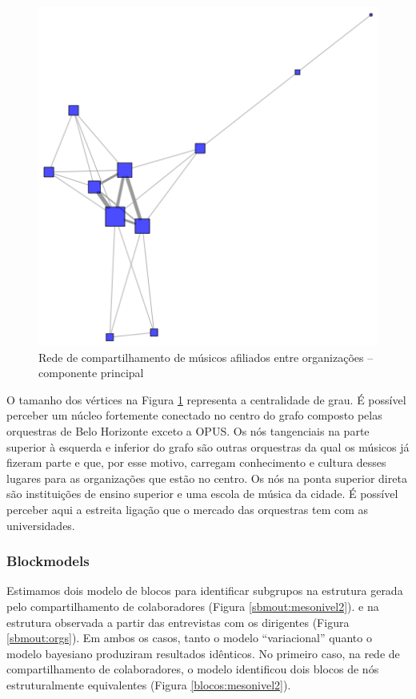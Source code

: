 \documentclass[a4paper, 12pt, openright, oneside, german, french, english, brazil]{abntex2}
\begin{document}
	\begin{figure}[!ht]
		\centering
		\caption{Rede de compartilhamento de músicos afiliados entre organizações -- componente principal}
		\label{rede:mesonivel2}
		\includegraphics[scale=.7]{mesonivel2.png}
	\end{figure}

	O tamanho dos vértices na Figura \ref{rede:mesonivel2} representa a centralidade de grau. É possível perceber um núcleo fortemente conectado no centro do grafo composto pelas orquestras de Belo Horizonte exceto a OPUS. Os nós tangenciais na parte superior à esquerda e inferior do grafo são outras orquestras da qual os músicos já fizeram parte e que, por esse motivo, carregam conhecimento e cultura desses lugares para as organizações que estão no centro. Os nós na ponta superior direta são instituições de ensino superior e uma escola de música da cidade. É possível perceber aqui a estreita ligação que o mercado das orquestras tem com as universidades.
	
	\subsubsection{Blockmodels}
	
	Estimamos dois modelo de blocos para identificar subgrupos na estrutura gerada pelo compartilhamento de colaboradores (Figura \ref{sbmout:mesonivel2}). e na estrutura observada a partir das entrevistas com os dirigentes (Figura \ref{sbmout:orgs}). Em ambos os casos, tanto o modelo ``variacional'' quanto o modelo bayesiano produziram resultados idênticos. No primeiro caso, na rede de compartilhamento de colaboradores, o modelo identificou dois blocos de nós estruturalmente equivalentes (Figura \ref{blocos:mesonivel2}).
	
\end{document}
